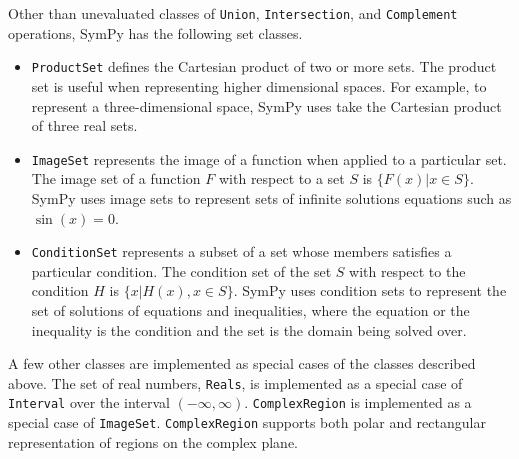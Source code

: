 
Other than unevaluated classes of \texttt{Union}, \texttt{Intersection}, and
\texttt{Complement} operations, SymPy has the following set classes.

\begin{itemize}

    \item \verb|ProductSet| defines the Cartesian product of two
        or more sets. The product set is useful when representing higher
        dimensional spaces. For example, to represent a three-dimensional space,
        SymPy uses take the Cartesian product of three real sets.

      \item \verb|ImageSet| represents the image of a function when applied to
        a particular set. The image set of a function $F$ with respect to a set
        $S$ is $\{ F(x) | x \in S \}$. SymPy uses image sets to represent sets
        of infinite solutions equations such as $\sin(x)=0$.


      \item \verb|ConditionSet| represents a subset of a set whose members
        satisfies a particular condition. The condition set of the set $S$ with
        respect to the condition $H$ is $\{x | H(x), x \in S \}$. SymPy uses
        condition sets to represent the set of solutions of equations and
        inequalities, where the equation or the inequality is the condition and
        the set is the domain being solved
        over.

\end{itemize}

A few other classes are implemented as special cases of the classes described
above. The set of real numbers, \verb|Reals|, is implemented as a special case
of \verb|Interval| over the interval $(-\infty, \infty)$. \verb|ComplexRegion|
is implemented as a special case of \verb|ImageSet|. \verb|ComplexRegion|
supports both polar and rectangular representation of regions on the complex
plane.

